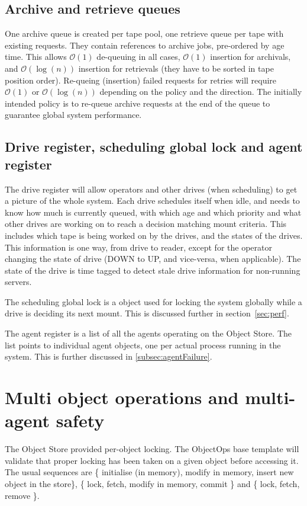 \subsection{Archive and retrieve queues}
One archive queue is created per tape pool, one retrieve queue per tape with existing requests. They contain references to archive jobs, pre-ordered by age time. This allows $\mathcal{O}(1)$ de-queuing in all cases, $\mathcal{O}(1)$ insertion for archivals, and $\mathcal{O}(\log{}(n))$ insertion for retrievals (they have to be sorted in tape position order). Re-queing (insertion) failed requests for retries will require $\mathcal{O}(1)$ or $\mathcal{O}(\log{}(n))$ depending on the policy and the direction. The initially intended policy is to re-queue archive requests at the end of the queue to guarantee global system performance.

\subsection{Drive register, scheduling global lock and agent register}
The drive register will allow operators and other drives (when scheduling) to get a picture of the whole system. Each drive schedules itself when idle, and needs to know how much is currently queued, with which age and which priority and what other drives are working on to reach a decision matching mount criteria. This includes which tape is being worked on by the drives, and the states of the drives. This information is one way, from drive to reader, except for the operator changing the state of drive (DOWN to UP, and vice-versa, when applicable). The state of the drive is time tagged to detect stale drive information for non-running servers.

The scheduling global lock is a object used for locking the system globally while a drive is deciding its next mount. This is discussed further in section~\ref{sec:perf}.

The agent register is a list of all the agents operating on the Object Store. The list points to individual agent objects, one per actual process running in the system. This is further discussed in \ref{subsec:agentFailure}.

\section{Multi object operations and multi-agent safety}
The Object Store provided per-object locking. The ObjectOps base template will validate that proper locking has been taken on a given object before accessing it. The usual sequences are \{ initialise (in memory), modify in memory, insert new object in the store\}, \{ lock, fetch, modify in memory, commit \} and \{ lock, fetch, remove \}.

